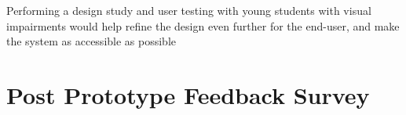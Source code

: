\documentclass[oneside,%
                    author={Malak Hajji},
                    degree={BSc},
                    title={Designing An Accessible Ozobot Programming Platform for Students},
                  subtitle={With Mixed Visual Abilities}]{dissertation}
\begin{document}
Performing a design study and user testing with young students with visual impairments would help refine the design even further for the end-user, and make the system as accessible as possible


%
%
%

\backmatter





\appendix

\chapter{Post Prototype Feedback Survey}
\label{appx:survey}
\end{document}
